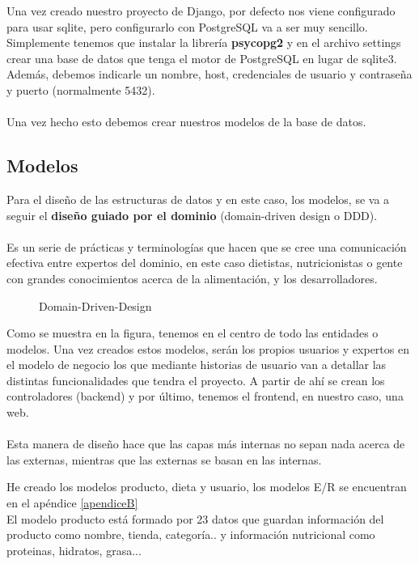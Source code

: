 Una vez creado nuestro proyecto de Django, por defecto nos viene configurado para usar sqlite, pero configurarlo con PostgreSQL va a ser muy sencillo.
Simplemente tenemos que instalar la librería \textbf{psycopg2} y en el archivo settings crear una base de datos que tenga el motor de PostgreSQL en lugar de sqlite3.
Además, debemos indicarle un nombre, host, credenciales de usuario y contraseña y puerto (normalmente 5432).\\ \\

Una vez hecho esto debemos crear nuestros modelos de la base de datos.

\subsection{Modelos}

Para el diseño de las estructuras de datos y en este caso, los modelos, se va a seguir el \textbf{diseño guiado por el dominio} \cite{DDD} (domain-driven design o DDD).\\ \\

Es un serie de prácticas y terminologías que hacen que se cree una comunicación efectiva entre expertos del dominio, en este caso dietistas, nutricionistas o gente con 
grandes conocimientos acerca de la alimentación, y los desarrolladores.\\

\begin{figure}[H]
  \centering
  \noindent{}
  \caption{Domain-Driven-Design}
\end{figure}

Como se muestra en la figura, tenemos en el centro de todo las entidades o modelos. Una vez creados estos modelos, serán los propios usuarios y expertos en el modelo de negocio los que
mediante historias de usuario van a detallar las distintas funcionalidades que tendra el proyecto. A partir de ahí se crean los controladores (backend) y por último, tenemos el frontend,
en nuestro caso, una web.\\ \\

Esta manera de diseño hace que las capas más internas no sepan nada acerca de las externas, mientras que las externas se basan en las internas.

He creado los modelos producto, dieta y usuario, los modelos E/R se encuentran en el apéndice \ref*{apendiceB}\\
El modelo producto está formado por 23 datos que guardan información del producto como nombre, tienda, categoría.. y información nutricional como proteinas, hidratos, grasa...\\\\

